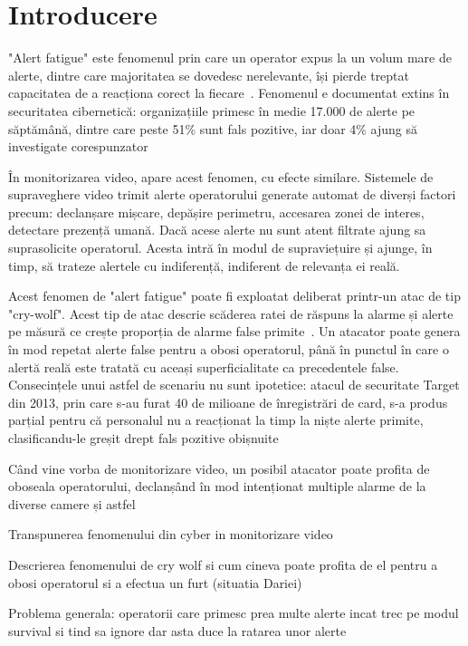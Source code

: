 \chapter{Introducere}\label{ch:intro}
\pagestyle{fancy}


"Alert fatigue" este fenomenul prin care un operator
expus la un volum mare de alerte, dintre care majoritatea
se dovedesc nerelevante, își pierde treptat capacitatea de a 
reacționa corect la fiecare~\cite{Ndichu2026}. Fenomenul
e documentat extins în securitatea cibernetică: organizațiile
primesc în medie 17.000 de alerte pe săptămână, dintre care
peste 51\% sunt fals pozitive, iar doar 4\% ajung să investigate 
corespunzator~\cite{Hassan2019}

În monitorizarea video, apare acest fenomen, cu efecte similare. 
Sistemele de supraveghere video trimit alerte operatorului 
generate automat de diverși factori precum: declanșare mișcare, 
depășire perimetru, accesarea zonei de interes, detectare prezență umană.
Dacă acese alerte nu sunt atent filtrate ajung sa suprasolicite 
operatorul. Acesta intră în modul de supraviețuire și ajunge, în timp, să
trateze alertele cu indiferență, indiferent de relevanța ei reală.

Acest fenomen de "alert fatigue" poate fi exploatat deliberat 
printr-un atac de tip "cry-wolf". Acest tip de atac descrie scăderea
ratei de răspuns la alarme și alerte pe măsură ce crește proporția de
alarme false primite~\cite{bliss1995reversal}. Un atacator poate genera
în mod repetat alerte false pentru a obosi operatorul, până în punctul în care
o alertă reală este tratată cu aceași superficialitate ca precedentele
false. Consecințele unui astfel de scenariu nu sunt ipotetice: atacul de 
securitate Target din 2013, prin care s-au furat 40 de milioane de înregistrări
de card, s-a produs parțial pentru că personalul nu a reacționat la timp la niște alerte
primite, clasificandu-le greșit drept fals pozitive obișnuite~\cite{Hassan2019}

Când vine vorba de monitorizare video, un posibil atacator poate profita
de oboseala operatorului, declanșând în mod intenționat multiple alarme
de la diverse camere și astfel 



Transpunerea fenomenului din cyber in monitorizare video

Descrierea fenomenului de cry wolf si cum cineva poate profita
de el pentru a obosi operatorul si a efectua un furt (situatia
Dariei)

Problema generala: operatorii care primesc prea multe alerte
incat trec pe modul survival si tind sa ignore
dar asta duce la ratarea unor alerte

